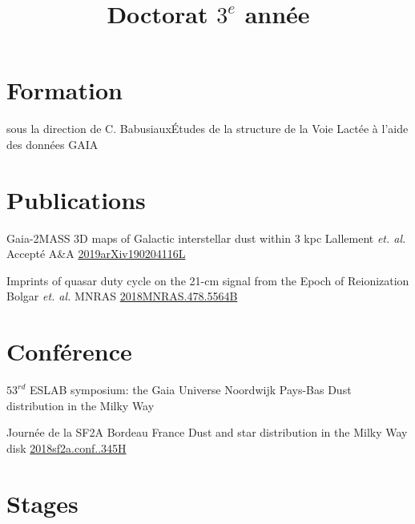 \documentclass{moderncv}
\title{Doctorat $3^{e}$ année}
\begin{document}
\maketitle


\section{Formation}
{sous la direction de C. Babusiaux}{\'Etudes de la structure de la Voie Lactée à l'aide des
  données GAIA}
	
\section{Publications}%
{Gaia-2MASS 3D maps of Galactic interstellar dust within 3 kpc}
{Lallement \textit{et. al.}}
{Accepté A\&A}
{\href{https://ui.adsabs.harvard.edu/\#abs/2019arXiv190204116L/abstract}{2019arXiv190204116L}}
{}

{Imprints of quasar duty cycle on the 21-cm signal from the Epoch of Reionization}
{Bolgar \textit{et. al.}}
{MNRAS}
{\href{https://ui.adsabs.harvard.edu/\#abs/2019arXiv190204116L/abstract}{2018MNRAS.478.5564B}}
{}

\section{Conférence}
{$53^{rd}$ ESLAB symposium: the Gaia Universe}
{Noordwijk}
{Pays-Bas}
{Dust distribution in the Milky Way}
{}

{Journée de la SF2A}
{Bordeau}
{France}
{Dust and star distribution in the Milky Way disk}
{\href{https://ui.adsabs.harvard.edu/\#abs/2018sf2a.conf..345H/abstract}{2018sf2a.conf..345H}}

	
\section{Stages}
  
\end{document}
